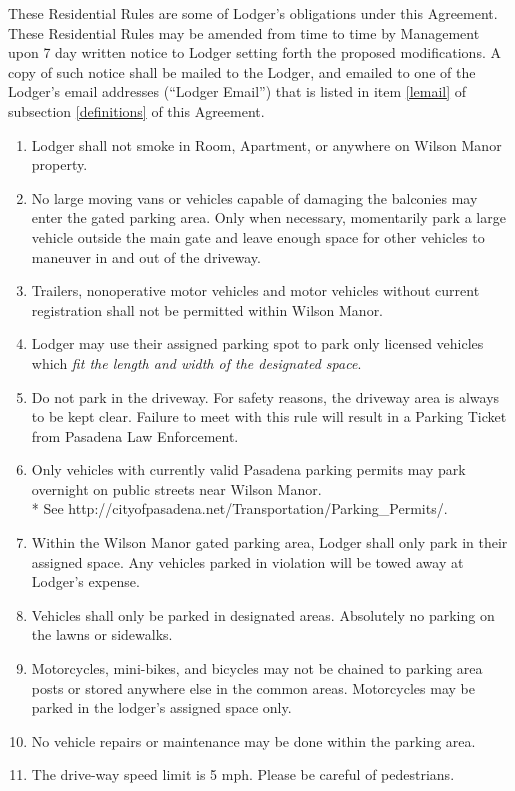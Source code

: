 \documentclass[12pt,letterpaper]{article}
\newcommand{\lodger}{Lodger}
\newcommand{\rules}{Residential Rules}
\newcommand{\management}{Management}
\newcommand{\condo}{Wilson Manor}
\newcommand{\apt}{Apartment}
\newcommand{\room}{Room}
\newcommand{\lemail}{Lodger Email}
\begin{document}
 These \rules{} are some of \lodger{}'s obligations under this Agreement. These Residential Rules may be amended from time to time by \management{} upon 7 day written notice to \lodger{} setting forth the proposed modifications. A copy of such notice shall be mailed to the \lodger{}, and emailed to one of the \lodger{}'s email addresses (``\lemail{}'') that is listed in item \ref{lemail} of subsection \ref{definitions} of this Agreement.

\begin{enumerate}
	\item \lodger{} shall not smoke in \room{}, \apt{}, or anywhere on \condo{} property.
	\item No large moving vans or vehicles capable of damaging the balconies may enter the gated parking area. Only when necessary, momentarily park a large vehicle outside the main gate and leave enough space for other vehicles to maneuver in and out of the driveway. 
	\item Trailers, nonoperative motor vehicles and motor vehicles without current registration shall not be permitted within \condo{}. 
	\item \lodger{} may use their assigned parking spot to park only licensed vehicles which \textit{fit the length and width of the designated space}.
	\item Do not park in the driveway. For safety reasons, the driveway area is always to be kept clear. Failure to meet with this rule will result in a Parking Ticket from Pasadena Law Enforcement. 
	\item Only vehicles with currently valid Pasadena parking permits may park overnight on public streets near \condo{}.\\* See http://cityofpasadena.net/Transportation/Parking\_Permits/.
	\item Within the \condo{} gated parking area, \lodger{} shall only park in their assigned space. Any vehicles parked in violation will be towed away at \lodger{}'s expense.
	\item Vehicles shall only be parked in designated areas. Absolutely no parking on the lawns or sidewalks. 
	\item Motorcycles, mini-bikes, and bicycles may not be chained to parking area posts or stored anywhere else in the common areas. Motorcycles may be parked in the lodger's assigned space only.
	\item No vehicle repairs or maintenance may be done within the parking area. 
	\item The drive-way speed limit is 5 mph. Please be careful of pedestrians.

\end{enumerate}
\end{document}
